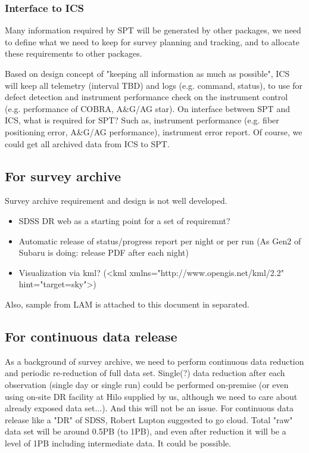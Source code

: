 \documentclass[a4paper,notitlepage]{article}
\begin{document}
\subsubsection{Interface to ICS}

Many information required by SPT will be generated by other packages, we need 
to define what we need to keep for survey planning and tracking, and to 
allocate these requirements to other packages. 

Based on design concept of "keeping all information as much as possible", 
ICS will keep all telemetry (interval TBD) and logs (e.g. command, status), 
to use for defect detection and instrument performance check on the 
instrument control (e.g. performance of COBRA, A\&G/AG star).
On interface between SPT and ICS, what is required for SPT? Such as, instrument 
performance (e.g. fiber positioning error, A\&G/AG performance), instrument 
error report. Of course, we could get all archived data from ICS to SPT. 



\subsection{For survey archive}

Survey archive requirement and design is not well developed.

\begin{itemize}
  \item SDSS DR web as a starting point for a set of requiremnt?
  \item Automatic release of status/progress report per night or per run
    (As Gen2 of Subaru is doing: release PDF after each night)
  \item Visualization via kml? 
    (<kml xmlns="http://www.opengis.net/kml/2.2" hint="target=sky">)
\end{itemize}

Also, sample from LAM is attached to this document in separated. 

\subsection{For continuous data release}

As a background of survey archive, we need to perform continuous data 
reduction and periodic re-reduction of full data set.
Single(?) data reduction after each observation (single day or single run) 
could be performed on-premise (or even using on-site DR facility at Hilo 
supplied by us, although we need to care about already exposed data set...). 
And this will not be an issue.
For continuous data release like a "DR" of SDSS, Robert Lupton suggested to 
go cloud. Total "raw" data set will be around 0.5PB (to 1PB), and even after 
reduction it will be a level of 1PB including intermediate data.
It could be possible.
\end{document}
